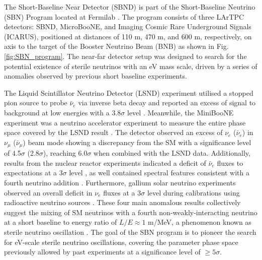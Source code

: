 The Short-Baseline Near Detector (SBND) is part of the Short-Baseline Neutrino (SBN) Program located at Fermilab \cite{SBNProgram}. 
The program consists of three LArTPC detectors: SBND, MicroBooNE, and Imaging Cosmic Rare Underground Signals (ICARUS), positioned at distances of 110 m, 470 m, and 600 m, respectively, on axis to the target of the Booster Neutrino Beam (BNB) as shown in Fig. \ref{fig:SBN_program}.
The near-far detector setup was designed to search for the potential existence of sterile neutrinos with an eV mass scale, driven by a series of anomalies observed by previous short baseline experiments.

The Liquid Scintillator Neutrino Detector (LSND) experiment utilised a stopped pion source to probe $\bar{\nu}_{e}$ via inverse beta decay and reported an excess of signal to background at low energies with a 3.8$\sigma$ level \cite{LSND_anomaly}. 
Meanwhile, the MiniBooNE experiment was a neutrino accelerator experiment to measure the entire phase space covered by the LSND result \cite{Miniboone_anomaly}.
The detector observed an excess of $\nu_{e}$ ($\bar{\nu}_{e}$) in $\nu_{\mu}$ ($\bar{\nu}_{\mu}$) beam mode showing a discrepancy from the SM with a significance level of 4.5$\sigma$ (2.8$\sigma$), reaching 6.0$\sigma$ when combined with the LSND data.
Additionally, results from the nuclear reactor experiments indicated a deficit of $\bar{\nu}_{e}$ fluxes to expectations at a 3$\sigma$ level \cite{reactor_anomaly_1, reactor_anomaly_2}, as well contained spectral features consistent with a fourth neutrino addition \cite{reactor_anomaly_3, reactor_anomaly_4}.
Furthermore, gallium solar neutrino experiments observed an overall deficit in $\nu_{e}$ fluxes at a 3$\sigma$ level during calibrations using radioactive neutrino sources \cite{galium_anomaly_1, galium_anomaly_2}.
These four main anomalous results collectively suggest the mixing of SM neutrinos with a fourth non-weakly-interacting neutrino at a short baseline to energy ratio of $L/E \approx 1 $ m/MeV, a phenomenon known as sterile neutrino oscillation \cite{SBNProgram}.
The goal of the SBN program is to pioneer the search for eV-scale sterile neutrino oscillations,  covering the parameter phase space previously allowed by past experiments at a significance level of $\geq 5 \sigma$.

